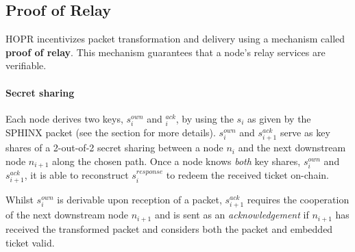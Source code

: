 \subsection{Proof of Relay}
\label{sec:proofofrelay}

HOPR incentivizes packet transformation and delivery using a mechanism called \textbf{proof of relay}. This mechanism guarantees that a node's relay services are verifiable.

\paragraph{Secret sharing}
\label{sec:proofofrelay:secretSharing}

Each node derives two keys, $s_i^{own}$ and $_i^{ack}$, by using the $s_i$ as given by the SPHINX packet (see the  section for more details). $s_i^{own}$ and $s_{i+1}^{ack}$ serve as key shares of a 2-out-of-2 secret sharing between a node $n_i$ and the next downstream node $n_{i+1}$ along the chosen path. Once a node knows \textit{both} key shares, $s_i^{own}$ and $s_{i+1}^{ack}$, it is able to reconstruct $s_i^{response}$ to redeem the received ticket on-chain.

Whilst $s_i^{own}$ is derivable upon reception of a packet, $s_{i+1}^{ack}$ requires the cooperation of the next downstream node $n_{i+1}$ and is sent as an \textit{acknowledgement} if $n_{i+1}$ has received the transformed packet and considers both the packet and embedded ticket valid.

